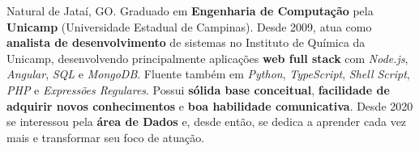 

\begin{cvparagraph}

Natural de Jataí, GO. Graduado em \textbf{Engenharia de Computação} pela \textbf{Unicamp} (Universidade Estadual de Campinas). Desde 2009, atua como \textbf{analista de desenvolvimento} de sistemas no Instituto de Química da Unicamp, desenvolvendo principalmente aplicações \textbf{web full stack} com \textit{Node.js}, \textit{Angular}, \textit{SQL} e \textit{MongoDB}. Fluente também em \textit{Python}, \textit{TypeScript}, \textit{Shell Script}, \textit{PHP} e \textit{Expressões Regulares}. Possui \textbf{sólida base conceitual}, \textbf{facilidade de adquirir novos conhecimentos} e \textbf{boa habilidade comunicativa}. Desde 2020 se interessou pela \textbf{área de Dados} e, desde então, se dedica a aprender cada vez mais e transformar seu foco de atuação.
\end{cvparagraph}

